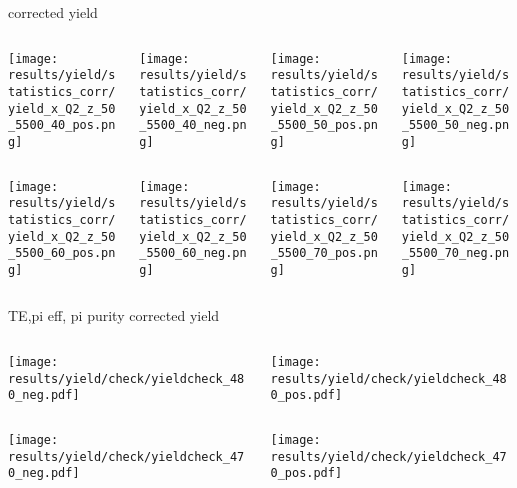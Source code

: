\begin{frame}{corrected yield}
\begin{columns}
\begin{column}[T]{0.25\textwidth}
\texttt{[image: results/yield/statistics\_corr/yield\_x\_Q2\_z\_50\_5500\_40\_pos.png]}
\end{column}
\begin{column}[T]{0.25\textwidth}
\texttt{[image: results/yield/statistics\_corr/yield\_x\_Q2\_z\_50\_5500\_40\_neg.png]}
\end{column}
\begin{column}[T]{0.25\textwidth}
\texttt{[image: results/yield/statistics\_corr/yield\_x\_Q2\_z\_50\_5500\_50\_pos.png]}
\end{column}
\begin{column}[T]{0.25\textwidth}
\texttt{[image: results/yield/statistics\_corr/yield\_x\_Q2\_z\_50\_5500\_50\_neg.png]}
\end{column}
\end{columns}
\begin{columns}
\begin{column}[T]{0.25\textwidth}
\texttt{[image: results/yield/statistics\_corr/yield\_x\_Q2\_z\_50\_5500\_60\_pos.png]}
\end{column}
\begin{column}[T]{0.25\textwidth}
\texttt{[image: results/yield/statistics\_corr/yield\_x\_Q2\_z\_50\_5500\_60\_neg.png]}
\end{column}
\begin{column}[T]{0.25\textwidth}
\texttt{[image: results/yield/statistics\_corr/yield\_x\_Q2\_z\_50\_5500\_70\_pos.png]}
\end{column}
\begin{column}[T]{0.25\textwidth}
\texttt{[image: results/yield/statistics\_corr/yield\_x\_Q2\_z\_50\_5500\_70\_neg.png]}
\end{column}
\end{columns}
\end{frame}
\begin{frame}{TE,pi eff, pi purity corrected yield}
\begin{columns}
\begin{column}[T]{0.5\textwidth}
\texttt{[image: results/yield/check/yieldcheck\_480\_neg.pdf]}
\end{column}
\begin{column}[T]{0.5\textwidth}
\texttt{[image: results/yield/check/yieldcheck\_480\_pos.pdf]}
\end{column}
\end{columns}
\begin{columns}
\begin{column}[T]{0.5\textwidth}
\texttt{[image: results/yield/check/yieldcheck\_470\_neg.pdf]}
\end{column}
\begin{column}[T]{0.5\textwidth}
\texttt{[image: results/yield/check/yieldcheck\_470\_pos.pdf]}
\end{column}
\end{columns}
\end{frame}
